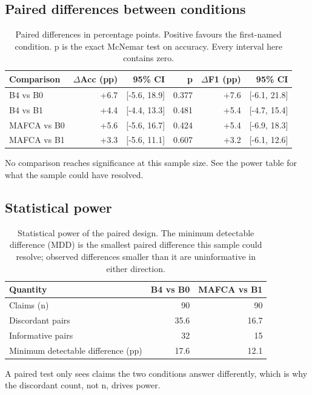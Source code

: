 \documentclass[11pt,a4paper]{article}
\begin{document}
\subsection{Paired differences between conditions}
\begin{table}[H]
\centering
\small
\caption{Paired differences in percentage points. Positive favours the first-named condition. p is the exact McNemar test on accuracy. Every interval here contains zero.}
\label{tab:differences}
\begin{tabular}{@{}lrrrrr@{}}
\toprule
\textbf{Comparison} & \textbf{$\Delta$Acc (pp)} & \textbf{95\% CI} & \textbf{p} & \textbf{$\Delta$F1 (pp)} & \textbf{95\% CI} \\
\midrule
B4 vs B0 & +6.7 & [-5.6, 18.9] & 0.377 & +7.6 & [-6.1, 21.8] \\
B4 vs B1 & +4.4 & [-4.4, 13.3] & 0.481 & +5.4 & [-4.7, 15.4] \\
MAFCA vs B0 & +5.6 & [-5.6, 16.7] & 0.424 & +5.4 & [-6.9, 18.3] \\
MAFCA vs B1 & +3.3 & [-5.6, 11.1] & 0.607 & +3.2 & [-6.1, 12.6] \\
\bottomrule
\end{tabular}
\par\vspace{2pt}\footnotesize{No comparison reaches significance at this sample size. See the power table for what the sample could have resolved.}
\end{table}
\subsection{Statistical power}
\begin{table}[H]
\centering
\small
\caption{Statistical power of the paired design. The minimum detectable difference (MDD) is the smallest paired difference this sample could resolve; observed differences smaller than it are uninformative in either direction.}
\label{tab:power}
\begin{tabular}{@{}lrr@{}}
\toprule
\textbf{Quantity} & \textbf{B4 vs B0} & \textbf{MAFCA vs B1} \\
\midrule
Claims (n) & 90 & 90 \\
Discordant pairs & 35.6 & 16.7 \\
Informative pairs & 32 & 15 \\
Minimum detectable difference (pp) & 17.6 & 12.1 \\
\bottomrule
\end{tabular}
\par\vspace{2pt}\footnotesize{A paired test only sees claims the two conditions answer differently, which is why the discordant count, not n, drives power.}
\end{table}
\end{document}
